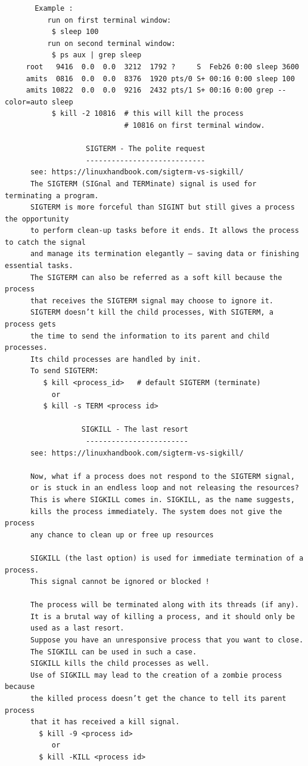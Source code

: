 \documentclass[a4paper,12pt]{article}
\begin{document}
\begin{verbatim}
       Example :
          run on first terminal window:
           $ sleep 100  
          run on second terminal window:       
           $ ps aux | grep sleep
     root   9416  0.0  0.0  3212  1792 ?     S  Feb26 0:00 sleep 3600
     amits  0816  0.0  0.0  8376  1920 pts/0 S+ 00:16 0:00 sleep 100
     amits 10822  0.0  0.0  9216  2432 pts/1 S+ 00:16 0:00 grep --color=auto sleep
           $ kill -2 10816  # this will kill the process 
                            # 10816 on first terminal window.
                   
                   SIGTERM - The polite request
                   ----------------------------
      see: https://linuxhandbook.com/sigterm-vs-sigkill/               
      The SIGTERM (SIGnal and TERMinate) signal is used for terminating a program.
      SIGTERM is more forceful than SIGINT but still gives a process the opportunity
      to perform clean-up tasks before it ends. It allows the process to catch the signal
      and manage its termination elegantly – saving data or finishing essential tasks.
      The SIGTERM can also be referred as a soft kill because the process 
      that receives the SIGTERM signal may choose to ignore it. 
      SIGTERM doesn’t kill the child processes, With SIGTERM, a process gets
      the time to send the information to its parent and child processes. 
      Its child processes are handled by init.
      To send SIGTERM:
         $ kill <process_id>   # default SIGTERM (terminate)
           or   
         $ kill -s TERM <process id>   

                  SIGKILL - The last resort
                   ------------------------
      see: https://linuxhandbook.com/sigterm-vs-sigkill/               
      
      Now, what if a process does not respond to the SIGTERM signal, 
      or is stuck in an endless loop and not releasing the resources? 
      This is where SIGKILL comes in. SIGKILL, as the name suggests, 
      kills the process immediately. The system does not give the process 
      any chance to clean up or free up resources
      
      SIGKILL (the last option) is used for immediate termination of a process. 
      This signal cannot be ignored or blocked ! 
      
      The process will be terminated along with its threads (if any). 
      It is a brutal way of killing a process, and it should only be
      used as a last resort.
      Suppose you have an unresponsive process that you want to close. 
      The SIGKILL can be used in such a case. 
      SIGKILL kills the child processes as well. 
      Use of SIGKILL may lead to the creation of a zombie process because
      the killed process doesn’t get the chance to tell its parent process
      that it has received a kill signal.
        $ kill -9 <process id>
           or
        $ kill -KILL <process id>   


\end{verbatim}
\end{document}
